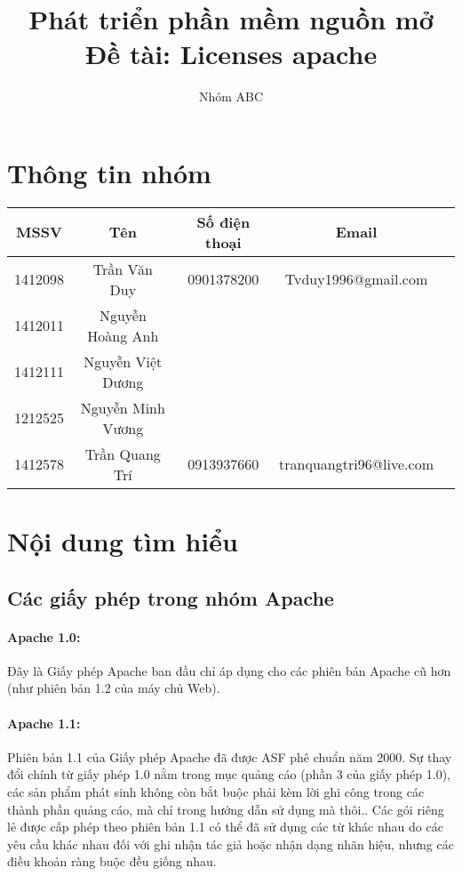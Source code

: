 \documentclass[12pt]{article}
\author{Nhóm ABC}
\begin{document}
\title{Phát triển phần mềm nguồn mở\\Đề tài:  Licenses apache}
\maketitle
\tableofcontents
\pagebreak
\section{Thông tin nhóm}
\begin{tabularx}{\textwidth}{|c|c|c|cX|}
\hline
MSSV & Tên & Số điện thoại & Email \\ \hline
1412098 & Trần Văn Duy & 0901378200 & Tvduy1996@gmail.com \\
1412011  & Nguyễn Hoàng Anh &  &  \\
1412111  & Nguyễn Việt Dương &  &  \\
1212525  & Nguyễn Minh Vương &  &  \\
1412578  & Trần Quang Trí & 0913937660 & tranquangtri96@live.com \\
\hline
\end{tabularx}

\section{Nội dung tìm hiểu}

\subsection{Các giấy phép trong nhóm Apache}

\paragraph{Apache 1.0:}
Đây là Giấy phép Apache ban đầu chỉ áp dụng cho các phiên bản Apache cũ hơn (như phiên bản 1.2 của máy chủ Web).

\paragraph{Apache 1.1:}
Phiên bản 1.1 của Giấy phép Apache đã được ASF phê chuẩn năm 2000. Sự thay đổi chính từ giấy phép 1.0 nằm trong mục quảng cáo (phần 3 của giấy phép 1.0), các sản phẩm phát sinh không còn bắt buộc phải kèm lời ghi công trong các thành phần quảng cáo, mà chỉ trong hướng dẫn sử dụng mà thôi.. Các gói riêng lẻ được cấp phép theo phiên bản 1.1 có thể đã sử dụng các từ khác nhau do các yêu cầu khác nhau đối với ghi nhận tác giả hoặc nhận dạng nhãn hiệu, nhưng các điều khoản ràng buộc đều giống nhau. 
\end{document}
